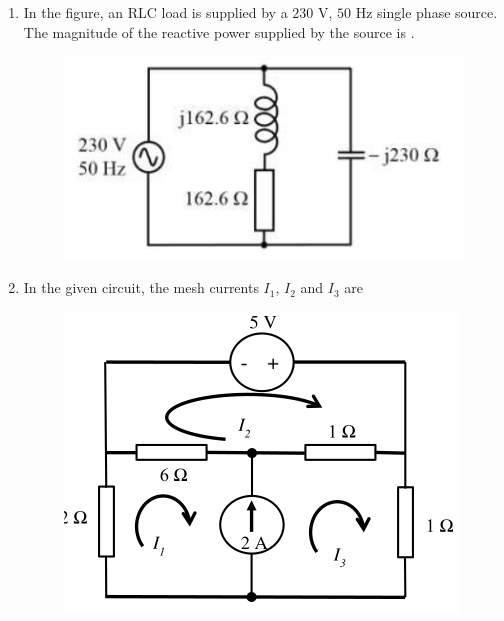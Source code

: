 \documentclass[journal,12pt,onecolumn]{IEEEtran}
\theoremstyle{remark}
\begin{document}
\begin{enumerate}
    \hfill{}

    \item In the figure, an RLC load is supplied by a $230$ V, $50$ Hz single phase source. The magnitude of the reactive power  supplied by the source is \underline{\hspace{2cm}}.
    \begin{figure}[H]
        \centering
        \includegraphics[width=0.5\columnwidth]{q31.png}
        \caption*{}
        \label{fig:q31}
    \end{figure}
    
    \hfill{}

    \item In the given circuit, the mesh currents $I_{1}$, $I_{2}$ and $I_{3}$ are
    \begin{figure}[H]
        \centering
        \includegraphics[width=0.4\columnwidth]{q32.png}
        \caption*{}
        \label{fig:q32}
    \end{figure}
    
    \hfill{}
    \begin{enumerate}
    \end{enumerate}
    

\end{enumerate}
\end{document}
